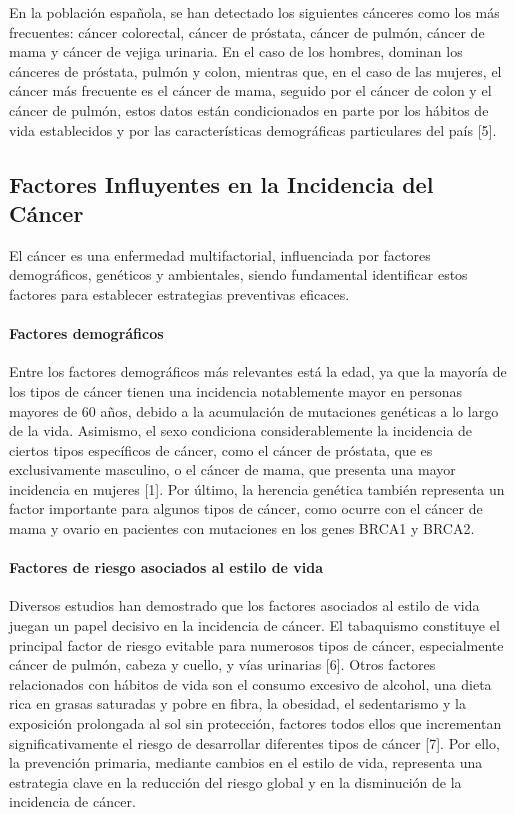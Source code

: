 En la población española, se han detectado los siguientes cánceres como los más frecuentes: cáncer colorectal, cáncer de próstata, cáncer de pulmón, cáncer de mama y cáncer de vejiga urinaria. En el caso de los hombres, dominan los cánceres de próstata, pulmón y colon, mientras que, en el caso de las mujeres, el cáncer más frecuente es el cáncer de mama, seguido por el cáncer de colon y el cáncer de pulmón, estos datos están condicionados en parte por los hábitos de vida establecidos y por las características demográficas particulares del país [5]. 

\subsection{Factores Influyentes en la Incidencia del Cáncer}
\label{sec:influencing-factors} 

El cáncer es una enfermedad multifactorial, influenciada por factores demográficos, genéticos y ambientales, siendo fundamental identificar estos factores para establecer estrategias preventivas eficaces. 

\paragraph{Factores demográficos} 

Entre los factores demográficos más relevantes está la edad, ya que la mayoría de los tipos de cáncer tienen una incidencia notablemente mayor en personas mayores de 60 años, debido a la acumulación de mutaciones genéticas a lo largo de la vida. Asimismo, el sexo condiciona considerablemente la incidencia de ciertos tipos específicos de cáncer, como el cáncer de próstata, que es exclusivamente masculino, o el cáncer de mama, que presenta una mayor incidencia en mujeres [1]. Por último, la herencia genética también representa un factor importante para algunos tipos de cáncer, como ocurre con el cáncer de mama y ovario en pacientes con mutaciones en los genes BRCA1 y BRCA2. 

\paragraph{Factores de riesgo asociados al estilo de vida} 

Diversos estudios han demostrado que los factores asociados al estilo de vida juegan un papel decisivo en la incidencia de cáncer. El tabaquismo constituye el principal factor de riesgo evitable para numerosos tipos de cáncer, especialmente cáncer de pulmón, cabeza y cuello, y vías urinarias [6]. Otros factores relacionados con hábitos de vida son el consumo excesivo de alcohol, una dieta rica en grasas saturadas y pobre en fibra, la obesidad, el sedentarismo y la exposición prolongada al sol sin protección, factores todos ellos que incrementan significativamente el riesgo de desarrollar diferentes tipos de cáncer [7]. Por ello, la prevención primaria, mediante cambios en el estilo de vida, representa una estrategia clave en la reducción del riesgo global y en la disminución de la incidencia de cáncer.

